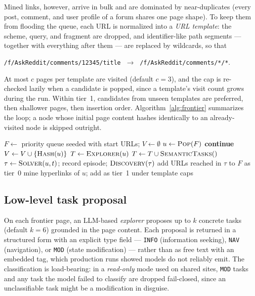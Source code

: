 Mined links, however, arrive in bulk and are dominated by near-duplicates
(every post, comment, and user profile of a forum shares one page shape). To
keep them from flooding the queue, each URL is normalized into a
\emph{URL template}: the scheme, query, and fragment are dropped, and
identifier-like path segments --- together with everything after them --- are
replaced by wildcards, so that
\begin{center}
\texttt{/f/AskReddit/comments/12345/title}
$\;\rightarrow\;$
\texttt{/f/AskReddit/comments/*/*}.
\end{center}
At most $c$ pages per template are
visited (default $c = 3$), and the cap is re-checked lazily when a candidate
is popped, since a template's visit count grows during the run. Within
tier~1, candidates from unseen templates are preferred, then shallower pages,
then insertion order. Algorithm~\ref{alg:frontier} summarizes the loop; a
node whose initial page content hashes identically to an already-visited node
is skipped outright.

\begin{algorithm}[H]
\caption{Graph-guided exploration loop}
\label{alg:frontier}
\begin{algorithmic}[1]
\State $F \gets$ priority queue seeded with start URLs; $V \gets \emptyset$
  \State $u \gets \textsc{Pop}(F)$ 
   \textbf{continue} \EndIf
  \State $V \gets V \cup \{\textsc{Hash}(u)\}$
  \State $T \gets \textsc{Explorer}(u)$ 
  \State $T \gets T \cup \textsc{SemanticTasks}()$ 
    \State $\tau \gets \textsc{Solver}(u, t)$; record episode; $\textsc{Discovery}(\tau)$
    \State add URLs reached in $\tau$ to $F$ as tier~0
  \EndFor
  \State mine hyperlinks of $u$; add as tier~1 under template caps
\EndWhile
\end{algorithmic}
\end{algorithm}

\subsection{Low-level task proposal}
\label{sec:method-lowlevel}

On each frontier page, an LLM-based \emph{explorer} proposes up to $k$
concrete tasks (default $k = 6$) grounded in the page content. Each proposal
is returned in a structured form with an explicit type field ---
\texttt{INFO} (information seeking), \texttt{NAV} (navigation), or
\texttt{MOD} (state modification) --- rather than as free text with an
embedded tag, which production runs showed models do not reliably emit. The
classification is load-bearing: in a \emph{read-only} mode used on shared
sites, \texttt{MOD} tasks and any task the model failed to classify are
dropped fail-closed, since an unclassifiable task might be a modification in
disguise.

